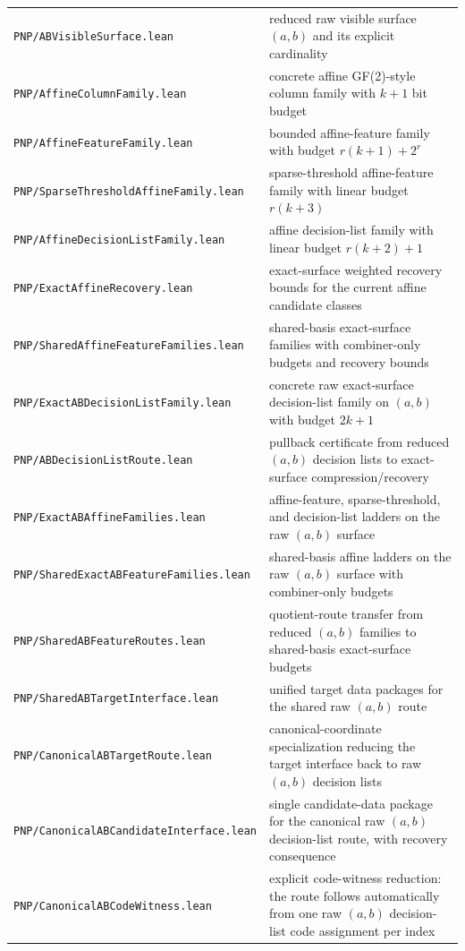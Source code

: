 \documentclass[11pt]{article}
\theoremstyle{remark}
\begin{document}
\begin{center}
\begin{tabular}{ll}
\texttt{PNP/ABVisibleSurface.lean} & reduced raw visible surface $(a,b)$ and its explicit cardinality \\
\texttt{PNP/AffineColumnFamily.lean} & concrete affine GF(2)-style column family with $k+1$ bit budget \\
\texttt{PNP/AffineFeatureFamily.lean} & bounded affine-feature family with budget $r(k+1)+2^r$ \\
\texttt{PNP/SparseThresholdAffineFamily.lean} & sparse-threshold affine-feature family with linear budget $r(k+3)$ \\
\texttt{PNP/AffineDecisionListFamily.lean} & affine decision-list family with linear budget $r(k+2)+1$ \\
\texttt{PNP/ExactAffineRecovery.lean} & exact-surface weighted recovery bounds for the current affine candidate classes \\
\texttt{PNP/SharedAffineFeatureFamilies.lean} & shared-basis exact-surface families with combiner-only budgets and recovery bounds \\
\texttt{PNP/ExactABDecisionListFamily.lean} & concrete raw exact-surface decision-list family on $(a,b)$ with budget $2k+1$ \\
\texttt{PNP/ABDecisionListRoute.lean} & pullback certificate from reduced $(a,b)$ decision lists to exact-surface compression/recovery \\
\texttt{PNP/ExactABAffineFamilies.lean} & affine-feature, sparse-threshold, and decision-list ladders on the raw $(a,b)$ surface \\
\texttt{PNP/SharedExactABFeatureFamilies.lean} & shared-basis affine ladders on the raw $(a,b)$ surface with combiner-only budgets \\
\texttt{PNP/SharedABFeatureRoutes.lean} & quotient-route transfer from reduced $(a,b)$ families to shared-basis exact-surface budgets \\
\texttt{PNP/SharedABTargetInterface.lean} & unified target data packages for the shared raw $(a,b)$ route \\
\texttt{PNP/CanonicalABTargetRoute.lean} & canonical-coordinate specialization reducing the target interface back to raw $(a,b)$ decision lists \\
\texttt{PNP/CanonicalABCandidateInterface.lean} & single candidate-data package for the canonical raw $(a,b)$ decision-list route, with recovery consequence \\
\texttt{PNP/CanonicalABCodeWitness.lean} & explicit code-witness reduction: the route follows automatically from one raw $(a,b)$ decision-list code assignment per index \\

\end{tabular}
\end{center}
\end{document}
